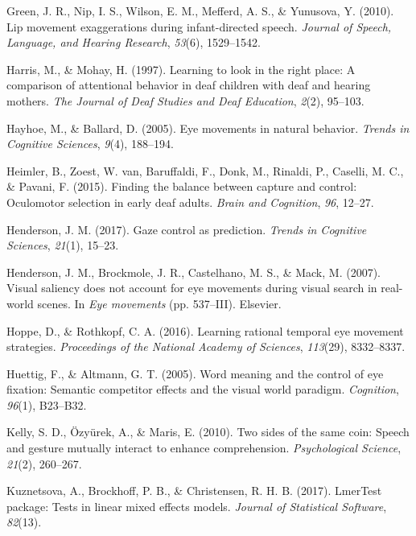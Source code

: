 \documentclass[,man,floatsintext]{apa6}
\begin{document}
\leavevmode\hypertarget{ref-green2010lip}{}%
Green, J. R., Nip, I. S., Wilson, E. M., Mefferd, A. S., \& Yunusova, Y. (2010). Lip movement exaggerations during infant-directed speech. \emph{Journal of Speech, Language, and Hearing Research}, \emph{53}(6), 1529--1542.

\leavevmode\hypertarget{ref-harris1997learning}{}%
Harris, M., \& Mohay, H. (1997). Learning to look in the right place: A comparison of attentional behavior in deaf children with deaf and hearing mothers. \emph{The Journal of Deaf Studies and Deaf Education}, \emph{2}(2), 95--103.

\leavevmode\hypertarget{ref-hayhoe2005eye}{}%
Hayhoe, M., \& Ballard, D. (2005). Eye movements in natural behavior. \emph{Trends in Cognitive Sciences}, \emph{9}(4), 188--194.

\leavevmode\hypertarget{ref-heimler2015finding}{}%
Heimler, B., Zoest, W. van, Baruffaldi, F., Donk, M., Rinaldi, P., Caselli, M. C., \& Pavani, F. (2015). Finding the balance between capture and control: Oculomotor selection in early deaf adults. \emph{Brain and Cognition}, \emph{96}, 12--27.

\leavevmode\hypertarget{ref-henderson2017gaze}{}%
Henderson, J. M. (2017). Gaze control as prediction. \emph{Trends in Cognitive Sciences}, \emph{21}(1), 15--23.

\leavevmode\hypertarget{ref-henderson2007visual}{}%
Henderson, J. M., Brockmole, J. R., Castelhano, M. S., \& Mack, M. (2007). Visual saliency does not account for eye movements during visual search in real-world scenes. In \emph{Eye movements} (pp. 537--III). Elsevier.

\leavevmode\hypertarget{ref-hoppe2016learning}{}%
Hoppe, D., \& Rothkopf, C. A. (2016). Learning rational temporal eye movement strategies. \emph{Proceedings of the National Academy of Sciences}, \emph{113}(29), 8332--8337.

\leavevmode\hypertarget{ref-huettig2005word}{}%
Huettig, F., \& Altmann, G. T. (2005). Word meaning and the control of eye fixation: Semantic competitor effects and the visual world paradigm. \emph{Cognition}, \emph{96}(1), B23--B32.

\leavevmode\hypertarget{ref-kelly2010two}{}%
Kelly, S. D., Özyürek, A., \& Maris, E. (2010). Two sides of the same coin: Speech and gesture mutually interact to enhance comprehension. \emph{Psychological Science}, \emph{21}(2), 260--267.

\leavevmode\hypertarget{ref-kuznetsova2017lmertest}{}%
Kuznetsova, A., Brockhoff, P. B., \& Christensen, R. H. B. (2017). LmerTest package: Tests in linear mixed effects models. \emph{Journal of Statistical Software}, \emph{82}(13).
\end{document}
